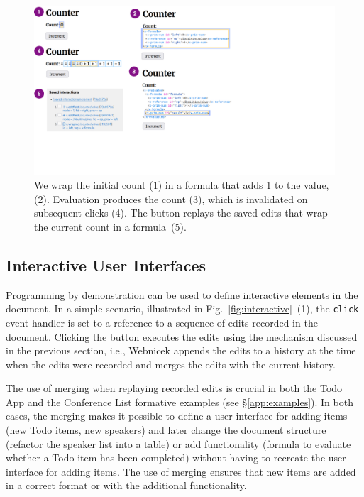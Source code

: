 \documentclass[sigconf]{acmart}
\begin{document}

\begin{figure}[t]
\includegraphics[width=0.95\columnwidth,clip,trim=0cm 5cm 11.5cm 0cm]{fig/counter.pdf}
\caption{We wrap the initial count (1) in a formula that adds 1 to the
value, (2). Evaluation produces the count (3), which is invalidated on subsequent clicks (4).
The button replays the saved edits that wrap the current count in a formula~(5).}
\label{fig:counter}
\end{figure}


\subsection{Interactive User Interfaces}
\label{sec:impl-interaction}

Programming by demonstration can be used to define interactive elements in the document. In a
simple scenario, illustrated in Fig.~\ref{fig:interactive}~(1), the {\small\texttt{click}} event
handler is set to a reference to a sequence of edits recorded in the document. Clicking the button
executes the edits using the mechanism discussed in the previous section, i.e., Webnicek appends
the edits to a history at the time when the edits were recorded and merges the edits with the
current history.

The use of merging when replaying recorded edits is crucial in both the Todo App and the Conference
List formative examples (see \S\ref{app:examples}). In both cases, the merging makes it possible to define
a user interface for adding items (new Todo items, new speakers) and later change the document
structure (refactor the speaker list into a table) or add functionality (formula to evaluate whether a
Todo item has been completed) without having to recreate the user interface for adding items.
The use of merging ensures that new items are added in a correct format or with the additional
functionality.
\end{document}
